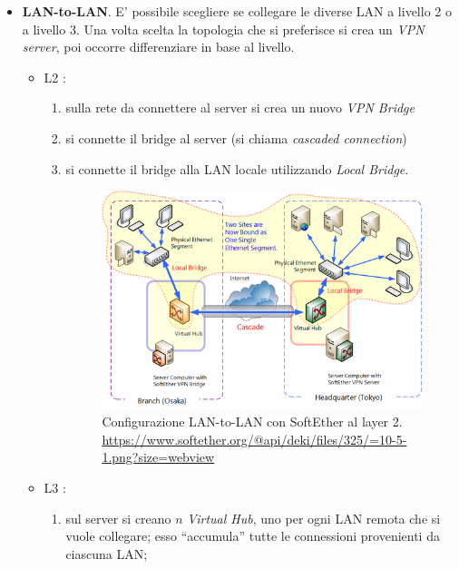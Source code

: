 \begin{itemize}
\begin{enumerate}
  \end{enumerate}
  \item \textbf{LAN-to-LAN}. E' possibile scegliere se collegare le diverse LAN
  a livello 2 o a livello 3.
  Una volta scelta la topologia che si preferisce si crea un \textit{VPN server}, poi occorre
  differenziare in base al livello.
  \begin{itemize}
    \item L2 \cite{softether-l2-lan-to-lan}:
    \begin{enumerate}
      \item sulla rete da connettere al server si crea un nuovo \textit{VPN Bridge}
      \item si connette il bridge al server (si chiama \textit{cascaded connection})
      \item si connette il bridge alla LAN locale utilizzando \textit{Local Bridge}.
      \begin{figure}
        \includegraphics[scale=0.55]{img/softether_l2_lan_to_lan}
        \caption[Configurazione LAN-to-LAN con SoftEther al layer 2]{
          Configurazione LAN-to-LAN con SoftEther al layer 2.
          \url{https://www.softether.org/@api/deki/files/325/=10-5-1.png?size=webview}}
          \label{fig:softether_l2_lan_to_lan}
      \end{figure}
    \end{enumerate}
    \item L3 \cite{softether-l3-lan-to-lan}:
    \begin{enumerate}
      \item sul server si creano $n$ \textit{Virtual Hub}, uno per ogni LAN remota che si vuole
      collegare; esso ``accumula'' tutte le connessioni provenienti da ciascuna LAN;

\end{enumerate}
\end{itemize}
\end{itemize}
